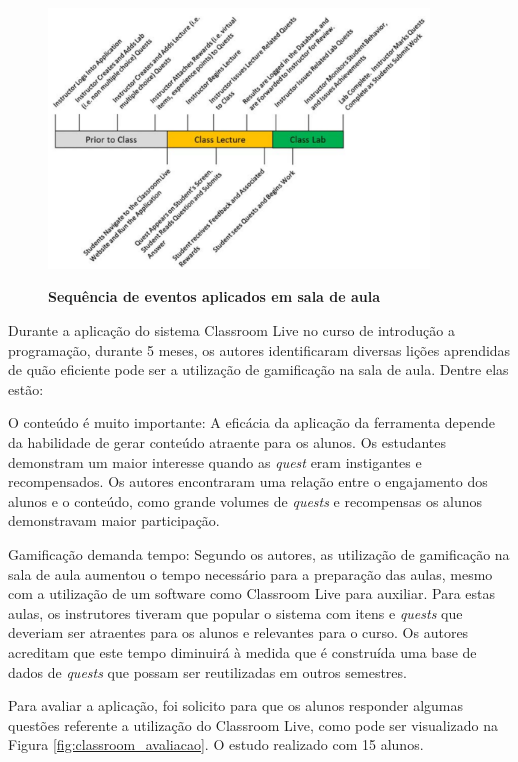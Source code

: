 \documentclass[
	12pt,				%
	oneside,			%
	a4paper,			%
	english,			%
	french,				%
	spanish,			%
	brazil,				%
	]{abntex2}
\begin{document}
\begin{figure}[ht]
\centering
\caption{\textbf{Sequência de eventos aplicados em sala de aula}}
\includegraphics[width=0.9\textwidth]{imagens/classroom_aula.png}
\label{fig:classroom_aula}
\end{figure}

Durante a aplicação do sistema Classroom Live no curso de introdução a programação, durante 5 meses, os autores identificaram diversas lições aprendidas de quão eficiente pode ser a utilização de gamificação na sala de aula. Dentre elas estão:

O conteúdo é muito importante: A eficácia da aplicação da ferramenta depende da habilidade de gerar conteúdo atraente para os alunos. Os estudantes demonstram um maior interesse quando as \textit{quest} eram instigantes e recompensados. Os autores encontraram uma relação entre o engajamento dos alunos e o conteúdo, como grande volumes de \textit{quests} e recompensas os alunos demonstravam maior participação.

Gamificação demanda tempo: Segundo os autores, as utilização de gamificação na sala de aula aumentou o tempo necessário para a preparação das aulas, mesmo com a utilização de um software como Classroom Live para auxiliar. Para estas aulas, os instrutores tiveram que popular o sistema com itens e \textit{quests} que deveriam ser atraentes para os alunos e relevantes para o curso. Os autores acreditam que este tempo diminuirá à medida que é construída uma base de dados de \textit{quests} que possam ser reutilizadas em outros semestres.

Para avaliar a aplicação, foi solicito para que os alunos responder algumas questões referente a utilização do Classroom Live, como pode ser visualizado na Figura \ref{fig:classroom_avaliacao}. O estudo realizado com 15 alunos.
\end{document}
